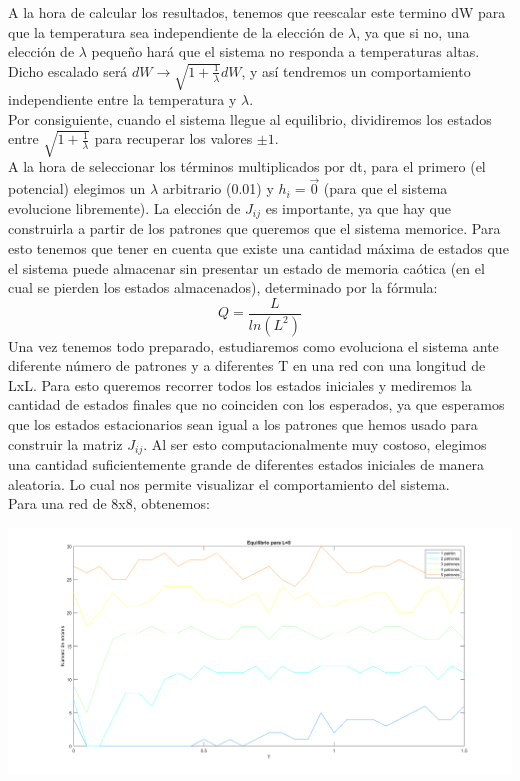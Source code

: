 \documentclass[titlepage,12pt]{article}
\numberwithin{equation}{section}
\begin{document}
A la hora de calcular los resultados, tenemos que reescalar este termino dW para que la temperatura sea independiente de la elección de $\lambda$, ya que si no, una elección de $\lambda$ pequeño hará que el sistema no responda a temperaturas altas. Dicho escalado será $dW \rightarrow \sqrt{1+\frac{1}{\lambda}}dW$, y así tendremos un comportamiento independiente entre la temperatura y $\lambda$.\\
Por consiguiente, cuando el sistema llegue al equilibrio, dividiremos los estados entre $ \sqrt{1+\frac{1}{\lambda}}$ para recuperar los valores $\pm 1$.\\
A la hora de seleccionar los términos multiplicados por dt, para el primero (el potencial) elegimos un $\lambda$ arbitrario (0.01) y $h_i=\vec{0}$ (para que el sistema evolucione libremente). La elección de $J_{ij}$ es importante, ya que hay que construirla a partir de los patrones que queremos que el sistema memorice. Para esto tenemos que tener en cuenta que existe una cantidad máxima de estados que el sistema puede almacenar sin presentar un estado de memoria caótica (en el cual se pierden los estados almacenados), determinado por la fórmula:
\begin{equation*}
    Q= \frac{L}{ln(L^2)}
\end{equation*}
Una vez tenemos todo preparado, estudiaremos como evoluciona el sistema ante diferente número de patrones y a diferentes T en una red con una longitud de LxL. Para esto queremos recorrer todos los estados iniciales y mediremos la cantidad de estados finales que no coinciden con los esperados, ya que esperamos que los estados estacionarios sean igual a los patrones que hemos usado para construir la matriz $J_{ij}$. Al ser esto computacionalmente muy costoso, elegimos una cantidad suficientemente grande de diferentes estados iniciales de manera aleatoria. Lo cual nos permite visualizar el comportamiento del sistema.\\

Para una red de 8x8, obtenemos:\\
\begin{center}
    \includegraphics[scale=0.3]{dinamicaL8.png}
\end{center}
\end{document}
